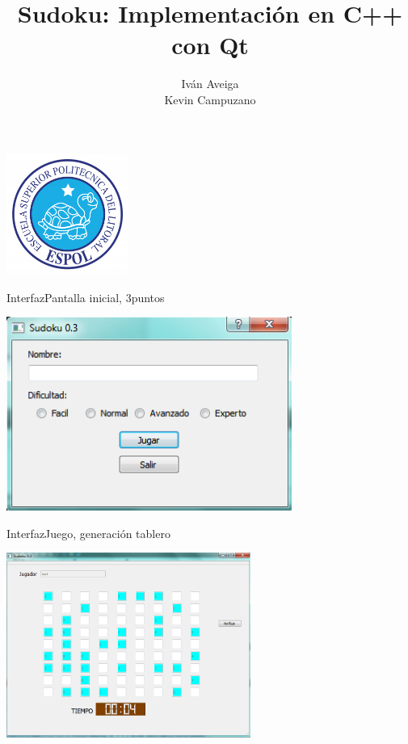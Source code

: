\documentclass[9pt]{beamer}
\title{Sudoku: Implementación en C++ con Qt}
\author{Iván Aveiga \\ Kevin Campuzano}
\institute{Escuela Superior Politécnica del Litoral}
\begin{document}
	\begin{frame}
		\begin{center}
			\includegraphics[width =0.30\textwidth]{logo.png}
		\end{center}
		\titlepage
		\scriptsize
	\end{frame}

	\begin{frame}{Interfaz}{Pantalla inicial, 3puntos}
		\begin{center}
			\includegraphics[width =0.70\textwidth]{inicio.png}
		\end{center}
	\end{frame}
	
	\begin{frame}{Interfaz}{Juego, generación tablero}
		\begin{center}
			\includegraphics[width =0.60\textwidth]{juego1.png}
		\end{center}
	\end{frame}
\end{document}
